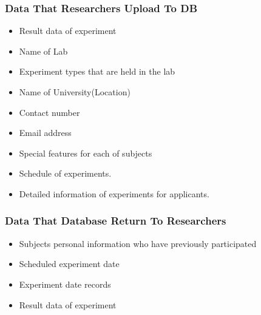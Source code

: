 \documentclass[letterpaper, 10 pt, conference]{ieeeconf}  %
\begin{document}
\subsubsection{\textbf{Data That Researchers Upload To DB\\}}
\begin{itemize}
\item Result data of experiment
\item Name of Lab
\item Experiment types that are held in the lab
\item Name of University(Location)
\item Contact number 
\item Email address
\item Special features for each of subjects
\item Schedule of experiments.
\item Detailed information of experiments for applicants.\\
\end{itemize}

\subsubsection{\textbf{Data That Database Return To Researchers\\} }
\begin{itemize}
\item Subjects personal information who have previously participated
\item Scheduled experiment date
\item Experiment date records
\item Result data of experiment\\
\end{itemize}
\end{document}
